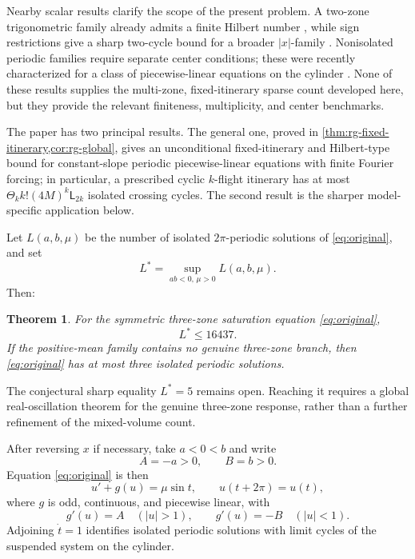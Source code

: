 \documentclass[11pt]{article}
\newtheorem{theorem}{Theorem}[section]
\begin{document}
Nearby scalar results clarify the scope of the present problem.  A two-zone trigonometric family already admits a finite Hilbert number \cite{BravoFernandezOjeda2024}, while sign restrictions give a sharp two-cycle bound for a broader $|x|$-family \cite{GasullZhao2023}.  Nonisolated periodic families require separate center conditions; these were recently characterized for a class of piecewise-linear equations on the cylinder \cite{BravoTrinidadForte2026Centers}.  None of these results supplies the multi-zone, fixed-itinerary sparse count developed here, but they provide the relevant finiteness, multiplicity, and center benchmarks.

The paper has two principal results.  The general one, proved in \cref{thm:rg-fixed-itinerary,cor:rg-global}, gives an unconditional fixed-itinerary and Hilbert-type bound for constant-slope periodic piecewise-linear equations with finite Fourier forcing; in particular, a prescribed cyclic $k$-flight itinerary has at most $\Theta_k k!(4M)^k\mathsf L_{2k}$ isolated crossing cycles.  The second result is the sharper model-specific application below.

Let $L(a,b,\mu)$ be the number of isolated $2\pi$-periodic solutions of \eqref{eq:original}, and set
\[
 L^*=\sup_{ab<0,\,\mu>0}L(a,b,\mu).
\]
Then:

\begin{theorem}\label{thm:main}
For the symmetric three-zone saturation equation \eqref{eq:original},
\[
 \boxed{L^*\le16437}.
\]
If the positive-mean family contains no genuine three-zone branch, then \eqref{eq:original} has at most three isolated periodic solutions.
\end{theorem}

The conjectural sharp equality \(L^*=5\) remains open.  Reaching it requires a
global real-oscillation theorem for the genuine three-zone response, rather
than a further refinement of the mixed-volume count.

After reversing $x$ if necessary, take $a<0<b$ and write
\[
 A=-a>0,\qquad B=b>0.
\]
Equation \eqref{eq:original} is then
\begin{equation}\label{eq:unbiased}
 u'+g(u)=\mu\sin t,
 \qquad u(t+2\pi)=u(t),
\end{equation}
where $g$ is odd, continuous, and piecewise linear, with
\begin{equation}\label{eq:slopes}
 g'(u)=A\quad (|u|>1),
 \qquad
 g'(u)=-B\quad (|u|<1).
\end{equation}
Adjoining $\dot t=1$ identifies isolated periodic solutions with limit cycles of the suspended system on the cylinder.
\end{document}
